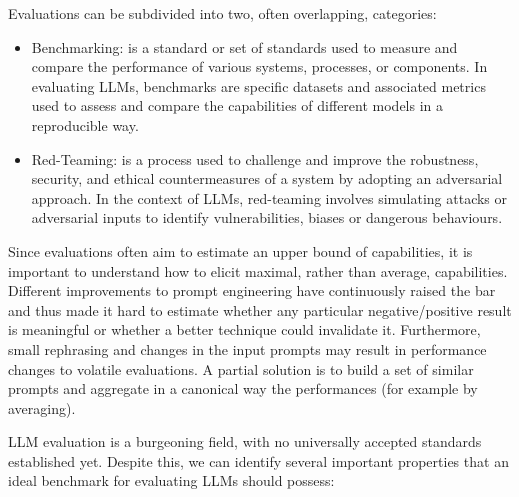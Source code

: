 Evaluations can be subdivided into two, often overlapping, categories:
\begin{itemize}
    \item Benchmarking: is a standard or set of standards used to measure and compare the performance of various systems, processes, or components. In evaluating LLMs, benchmarks are specific datasets and associated metrics used to assess and compare the capabilities of different models in a reproducible way.
    
    \item Red-Teaming: is a process used to challenge and improve the robustness, security, and ethical countermeasures of a system by adopting an adversarial approach. In the context of LLMs, red-teaming involves simulating attacks or adversarial inputs to identify vulnerabilities, biases or dangerous behaviours.
\end{itemize}

Since evaluations often aim to estimate an upper bound of capabilities, it is important to understand how to elicit maximal, rather than average, capabilities. Different improvements to prompt engineering have continuously raised the bar and thus made it hard to estimate whether any particular negative/positive result is meaningful or whether a better technique could invalidate it. Furthermore, small rephrasing and changes in the input prompts may result in performance changes to volatile evaluations. A partial solution is to build a set of similar prompts and aggregate in a canonical way the performances (for example by averaging).

LLM evaluation is a burgeoning field, with no universally accepted standards established yet. Despite this, we can identify several important properties that an ideal benchmark for evaluating LLMs should possess:

